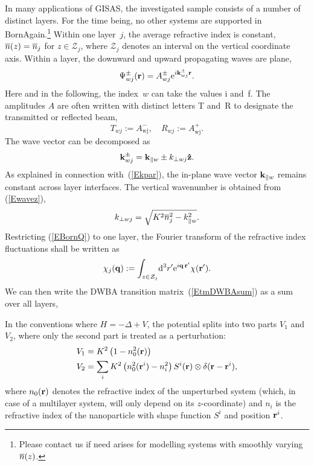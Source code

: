 In many applications of GISAS,
the investigated sample consists of a number of distinct layers.
For the time being,
no other systems are supported in BornAgain.\footnote
{Please contact us if need arises for modelling systems with
smoothly varying~$\overline{n}(z)$.}
Within one layer~$j$, the average refractive index is constant,
$\overline{n}(z)=\overline{n}_j$ for $z\in\mathcal{Z}_j$, where
$\mathcal{Z}_j$ denotes an interval on the vertical coordinate axis.
Within a layer,
the downward and upward propagating waves are plane,
\begin{equation}
  \Psi^\pm_{wj}(\mathbf{r})=A^\pm_{wj}{\rm e}^{i\mathbf{k}^\pm_{wj}\mathbf{r}}.
\end{equation}
Here and in the following,
the index~$w$ can take the values i and~f.
The amplitudes $A$ are often written with distinct letters
T and~R to designate the transmitted or reflected beam,
\begin{equation}
  T_{wj} := A^-_\text{wj},\quad
  R_{wj} := A^+_\text{wj}.
\end{equation}
The wave vector can be decomposed as
\begin{equation}
  \mathbf{k}^\pm_{wj}= \mathbf{k}_{\parallel w} \pm k_{\perp wj}\mathbf{\hat z}.
\end{equation}
As explained in connection with~(\ref{Ekpar}),
the in-plane wave vector $\mathbf{k}_{\parallel w}$ remains constant
across layer interfaces.
The vertical wavenumber is obtained from (\ref{Ewavez}),
\begin{equation}
  k_{\perp wj} = \sqrt{K^2 \overline{n}_j^2 - k_{\parallel w}^2}.
\end{equation}
Restricting (\ref{EBornQ}) to one layer,
the Fourier transform of the refractive index fluctuations
shall be written as
\begin{equation}\label{EBornQ}
  \chi_j(\mathbf{q})
  := \int_{z\in\mathcal{Z}_j}\!{\rm d}^3r' {\rm e}^{i\mathbf{q}\,\mathbf{r}'}\chi(\mathbf{r}').
\end{equation}
We can then write the DWBA transition matrix~(\ref{EtmDWBAsum}) as
a sum over all layers,

In the conventions where $H=-\Delta + V$, the potential splits into two parts $V_1$ and $V_2$, where only the second part is treated as a perturbation:
\begin{align*}
  V_1 & = K^2\left( 1-n_0^2(\mathbf{r})\right)  \\
  V_2 & = \sum_i K^2\left( n_0^2(\mathbf{r}^i) - n_i^2 \right) S^i(\mathbf{r}) \otimes \delta(\mathbf{r}-\mathbf{r}^i),
\end{align*}
where $n_0(\mathbf{r})$ denotes the refractive index of the unperturbed system (which, in case of a multilayer system, will only depend on its $z$-coordinate) and $n_i$ is the refractive index of the nanoparticle with shape function $S^i$ and position $\mathbf{r}^i$.

